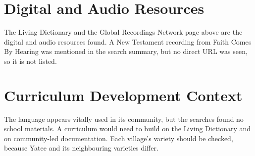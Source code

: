\documentclass[12pt]{article}
\begin{document}
\section{Digital and Audio Resources}
The Living Dictionary and the Global Recordings Network page above are the digital and audio resources found. A New Testament recording from Faith Comes By Hearing was mentioned in the search summary, but no direct URL was seen, so it is not listed.

\section{Curriculum Development Context}
The language appears vitally used in its community, but the searches found no school materials. A curriculum would need to build on the Living Dictionary and on community-led documentation. Each village's variety should be checked, because Yatee and its neighbouring varieties differ.
\end{document}
